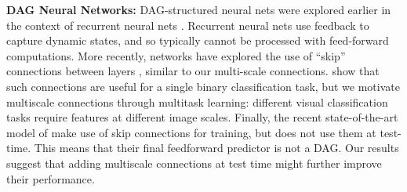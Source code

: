 \documentclass[10pt,twocolumn,letterpaper]{article}
\begin{document}

{\bf DAG Neural Networks:} DAG-structured neural nets were explored earlier in the context of recurrent neural nets \cite{baldi2003principled,graves2009offline}. Recurrent neural nets use feedback to capture dynamic states, and so typically cannot be processed with feed-forward computations. %
More recently, networks have explored the use of ``skip'' connections between layers \cite{raiko-aistats-12,GoogLeNet,sermanet2013pedestrian}, similar to our multi-scale connections. \cite{raiko-aistats-12} show that such connections are useful for a single binary classification task, but we motivate multiscale connections through multitask learning: different visual classification tasks require features at different image scales. %
Finally, the recent state-of-the-art model of \cite{GoogLeNet} make use of skip connections for training, but does not use them at test-time. This means that their final feedforward predictor is not a DAG. Our results suggest that adding multiscale connections at test time might further improve their performance.
\end{document}
